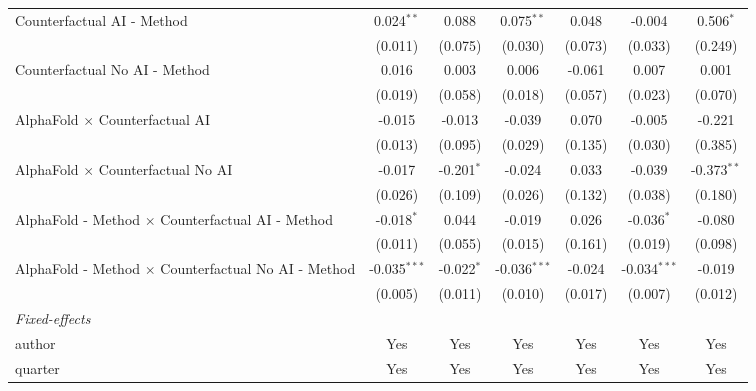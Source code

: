 \begin{tabular}{lcccccc}
   Counterfactual AI - Method                                 & 0.024$^{**}$   & 0.088        & 0.075$^{**}$   & 0.048   & -0.004         & 0.506$^{*}$\\   
                                                              & (0.011)        & (0.075)      & (0.030)        & (0.073) & (0.033)        & (0.249)\\   
   Counterfactual No AI - Method                              & 0.016          & 0.003        & 0.006          & -0.061  & 0.007          & 0.001\\   
                                                              & (0.019)        & (0.058)      & (0.018)        & (0.057) & (0.023)        & (0.070)\\   
   AlphaFold $\times$ Counterfactual AI                       & -0.015         & -0.013       & -0.039         & 0.070   & -0.005         & -0.221\\   
                                                              & (0.013)        & (0.095)      & (0.029)        & (0.135) & (0.030)        & (0.385)\\   
   AlphaFold $\times$ Counterfactual No AI                    & -0.017         & -0.201$^{*}$ & -0.024         & 0.033   & -0.039         & -0.373$^{**}$\\   
                                                              & (0.026)        & (0.109)      & (0.026)        & (0.132) & (0.038)        & (0.180)\\   
   AlphaFold - Method $\times$ Counterfactual AI - Method     & -0.018$^{*}$   & 0.044        & -0.019         & 0.026   & -0.036$^{*}$   & -0.080\\   
                                                              & (0.011)        & (0.055)      & (0.015)        & (0.161) & (0.019)        & (0.098)\\   
   AlphaFold - Method $\times$ Counterfactual No AI - Method  & -0.035$^{***}$ & -0.022$^{*}$ & -0.036$^{***}$ & -0.024  & -0.034$^{***}$ & -0.019\\   
                                                              & (0.005)        & (0.011)      & (0.010)        & (0.017) & (0.007)        & (0.012)\\   
   \midrule
   \emph{Fixed-effects}\\
   author                                                     & Yes            & Yes          & Yes            & Yes     & Yes            & Yes\\  
   quarter                                                    & Yes            & Yes          & Yes            & Yes     & Yes            & Yes\\  

\end{tabular}
